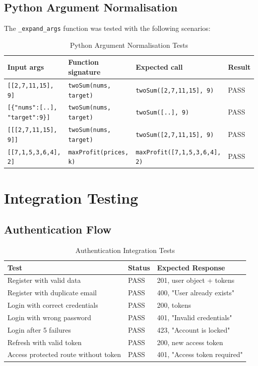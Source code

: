 \subsection{Python Argument Normalisation}

The \texttt{\_expand\_args} function was tested with the following scenarios:

\begin{table}[H]
\centering
\caption{Python Argument Normalisation Tests}
\vspace{8pt}
\begin{tabularx}{\textwidth}{|X|X|X|C{1.8cm}|}
\hline
\textbf{Input args} & \textbf{Function signature} & \textbf{Expected call} & \textbf{Result} \\
\hline
\texttt{[[2,7,11,15], 9]} & \texttt{twoSum(nums, target)} & \texttt{twoSum([2,7,11,15], 9)} & PASS \\
\hline
\texttt{[\{"nums":[..], "target":9\}]} & \texttt{twoSum(nums, target)} & \texttt{twoSum([..], 9)} & PASS \\
\hline
\texttt{[[[2,7,11,15], 9]]} & \texttt{twoSum(nums, target)} & \texttt{twoSum([2,7,11,15], 9)} & PASS \\
\hline
\texttt{[[7,1,5,3,6,4], 2]} & \texttt{maxProfit(prices, k)} & \texttt{maxProfit([7,1,5,3,6,4], 2)} & PASS \\
\hline
\end{tabularx}
\label{tab:argtest}
\end{table}

\section{Integration Testing}

\subsection{Authentication Flow}

\begin{table}[H]
\centering
\caption{Authentication Integration Tests}
\vspace{8pt}
\begin{tabularx}{\textwidth}{|X|C{1.8cm}|X|}
\hline
\textbf{Test} & \textbf{Status} & \textbf{Expected Response} \\
\hline
Register with valid data & PASS & 201, user object + tokens \\
\hline
Register with duplicate email & PASS & 400, "User already exists" \\
\hline
Login with correct credentials & PASS & 200, tokens \\
\hline
Login with wrong password & PASS & 401, "Invalid credentials" \\
\hline
Login after 5 failures & PASS & 423, "Account is locked" \\
\hline
Refresh with valid token & PASS & 200, new access token \\
\hline
Access protected route without token & PASS & 401, "Access token required" \\
\hline
\end{tabularx}
\label{tab:authtest}
\end{table}

